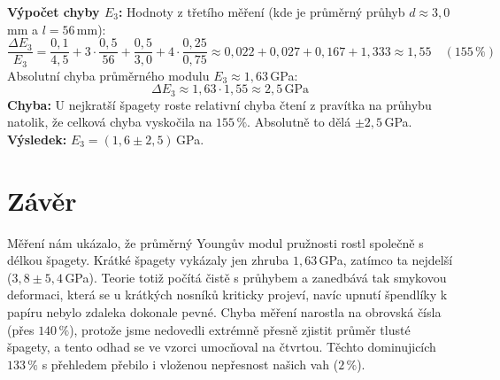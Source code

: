 \documentclass[a4paper,12pt]{article}
\begin{document}
\vspace{5mm}
\textbf{Výpočet chyby $E_3$:} Hodnoty z třetího měření (kde je průměrný průhyb $d \approx 3,0$\,mm a $l = 56$\,mm):
$$ \frac{\Delta E_3}{E_3} = \frac{0,1}{4,5} + 3 \cdot \frac{0,5}{56} + \frac{0,5}{3,0} + 4 \cdot \frac{0,25}{0,75} \approx 0,022 + 0,027 + 0,167 + 1,333 \approx 1,55 \quad (155\,\%) $$
Absolutní chyba průměrného modulu $E_3 \approx 1,63$\,GPa:
$$ \Delta E_3 \approx 1,63 \cdot 1,55 \approx 2,5\,\text{GPa} $$
\textbf{Chyba:} U nejkratší špagety roste relativní chyba čtení z pravítka na průhybu natolik, že celková chyba vyskočila na $155\,\%$. Absolutně to dělá $\pm 2,5$\,GPa. \\
\textbf{Výsledek:} $E_3 = (1,6 \pm 2,5)$\,GPa.

\section{Závěr}
Měření nám ukázalo, že průměrný Youngův modul pružnosti rostl společně s délkou špagety. Krátké špagety vykázaly jen zhruba $1,63$\,GPa, zatímco ta nejdelší ($3,8 \pm 5,4$\,GPa). Teorie totiž počítá čistě s průhybem a zanedbává tak smykovou deformaci, která se u krátkých nosníků kriticky projeví, navíc upnutí špendlíky k papíru nebylo zdaleka dokonale pevné. Chyba měření narostla na obrovská čísla (přes $140\,\%$), protože jsme nedovedli extrémně přesně zjistit průměr tlusté špagety, a tento odhad se ve vzorci umocňoval na čtvrtou. Těchto dominujicích $133\,\%$ s přehledem přebilo i vloženou nepřesnost našich vah ($2\,\%$).
\end{document}
